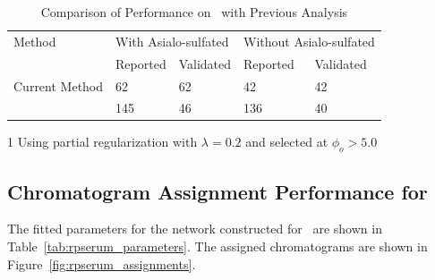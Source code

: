     \begin{table}[h]
        \centering
        \small
        \caption{Comparison of Performance on \philbs \ with Previous Analysis\label{tab:philbs_reanalysis_comparison}}
        \begin{threeparttable}
            \begin{tabular}{l l l l l}
                \toprule
                Method & \multicolumn{2}{l}{With Asialo-sulfated} & \multicolumn{2}{l}{Without Asialo-sulfated} \\
                \cmidrule(lr){2-3} \cmidrule(lr){4-5}
                & Reported & Validated & Reported & Validated \\
                \midrule
                Current Method \tnote{1} & 62 &   62  & 42 & 42 \\
                \cite{Khatri2016a} & 145 & 46 & 136 & 40\\
                \bottomrule
            \end{tabular}
            \begin{tablenotes}
                \item[1] Using partial regularization with $\lambda = 0.2$ and selected at $\phi_o > 5.0$
            \end{tablenotes}
        \end{threeparttable}
    \end{table}

\subsection{Chromatogram Assignment Performance for \rpserum}
    The fitted parameters for the network constructed for \rpserum \ are shown in
    Table~\ref{tab:rpserum_parameters}. The assigned chromatograms are shown in
    Figure~\ref{fig:rpserum_assignments}.

